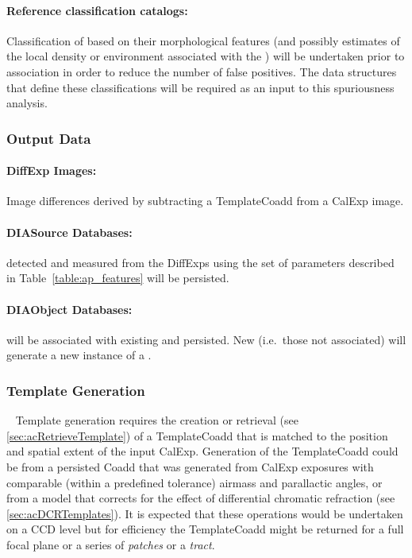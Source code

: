 \paragraph*{Reference classification catalogs:} Classification of \DIASources based on their morphological features (and possibly estimates of the local density or  environment associated with the \DIASource) will be undertaken prior to association in order to reduce the number of false positives. The data structures that define these classifications will be required as an input to this spuriousness analysis. 



\subsubsection{Output Data}
\label{sec:apADOutput}

\paragraph*{DiffExp Images:} Image differences derived by subtracting a TemplateCoadd from a CalExp image.

\paragraph*{DIASource Databases:} \DIASources detected and measured from the DiffExps using the set of parameters described in Table~\ref{table:ap_features} will be persisted.


\paragraph*{DIAObject Databases:} \DIASource will be associated with existing \DIAObjects and persisted. New \DIASource (i.e.\ those not associated) will generate a new instance of a \DIAObject.


\subsubsection{Template Generation}~
\label{sec:apCRTemplates}
Template generation requires the creation or retrieval (see \ref{sec:acRetrieveTemplate}) of a TemplateCoadd that is matched to the position and spatial extent of the input CalExp. Generation of the TemplateCoadd could be from a persisted Coadd that was generated from CalExp exposures with comparable (within a predefined tolerance) airmass and parallactic angles, or from a model that corrects for the effect of  differential chromatic refraction (see \ref{sec:acDCRTemplates}). It is expected that these operations would be undertaken on a CCD level but for efficiency the TemplateCoadd might be returned for a full focal plane or a series of {\it patches}  or a {\it tract}. 


